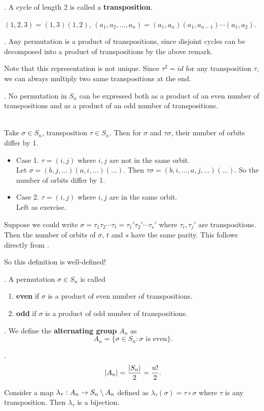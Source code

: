 .  A cycle of length 2 is called a \textbf{transposition}.

\rmk \((1, 2, 3) = (1, 3) (1, 2)\), \((a_1, a_2, \dots, a_n) = (a_1, a_n) (a_1, a_{n - 1}) \cdots (a_1, a_2)\).

\cor. Any permutation is a product of transpositions, since disjoint cycles can be decomposed into a product of transpositions by the above remark.

Note that this representation is not unique. Since \(\tau^2 = id\) for any transposition \(\tau\), we can always multiply two same transpositions at the end.

\thm. No permutation in \(S_n\) can be expressed both as a product of an even number of transpositions and as a product of an odd number of transpositions.

\pf \\
 Take \(\sigma \in S_n\), transposition \(\tau \in S_n\). Then for \(\sigma\) and \(\tau\sigma\), their number of orbits differ by 1.
\begin{itemize}
    \item Case 1. \(\tau = (i, j)\) where \(i, j\) are not in the same orbit. \\
    Let \(\sigma = (b, j, \dots) (a, i, \dots) (\dots)\). Then \(\tau\sigma = (b, i, \dots, a, j, \dots)(\dots)\). So the number of orbits differ by 1.
    \item Case 2. \(\tau = (i, j)\) where \(i, j\) are in the same orbit. \\
    Left as exercise.
\end{itemize}

 Suppose we could write \(\sigma = \tau_1\tau_2\cdots\tau_t = \tau_1'\tau_2'\cdots\tau_s'\) where \(\tau_i, \tau_j'\) are transpositions. Then the number of orbits of \(\sigma\), \(t\) and \(s\) have the same parity. This follows directly from .

So this definition is well-defined!

. A permutation \(\sigma \in S_n\) is called
\begin{enumerate}
    \item \textbf{even} if \(\sigma\) is a product of even number of transpositions.
    \item \textbf{odd} if \(\sigma\) is a product of odd number of transpositions.
\end{enumerate}

.  We define the \textbf{alternating group} \(A_n\) as
\[
    A_n = \{\sigma \in S_n : \sigma \text{ is even}\}.
\]

\thm.
\[
    \left| A_n \right| = \frac{\left| S_n \right|}{2} = \frac{n!}{2}.
\]

\pf Consider a map \(\lambda_\tau: A_n \rightarrow S_n \setminus A_n\) defined as \(\lambda_\tau(\sigma) = \tau\circ\sigma\) where \(\tau\) is any transposition. Then \(\lambda_\tau\) is a bijection.

\pagebreak
